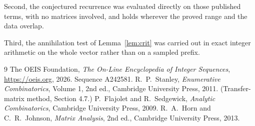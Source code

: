 \documentclass[11pt,a4paper]{article}
\theoremstyle{plain}
\theoremstyle{definition}
\begin{document}
Second, the conjectured recurrence was evaluated directly on those published terms, with no
matrices involved, and holds wherever the proved range and the data overlap.

Third, the annihilation test of Lemma~\ref{lem:crit} was carried out in exact integer
arithmetic on the whole vector rather than on a sampled prefix.

\begin{thebibliography}{9}
 The OEIS Foundation, \emph{The On-Line Encyclopedia of Integer
Sequences}, \url{https://oeis.org}, 2026. Sequence A242581.
 R.~P.~Stanley, \emph{Enumerative Combinatorics}, Volume 1, 2nd ed.,
Cambridge University Press, 2011. (Transfer-matrix method, Section 4.7.)
 P.~Flajolet and R.~Sedgewick, \emph{Analytic Combinatorics}, Cambridge
University Press, 2009.
 R.~A.~Horn and C.~R.~Johnson, \emph{Matrix Analysis}, 2nd ed., Cambridge
University Press, 2013.
\end{thebibliography}
\end{document}
